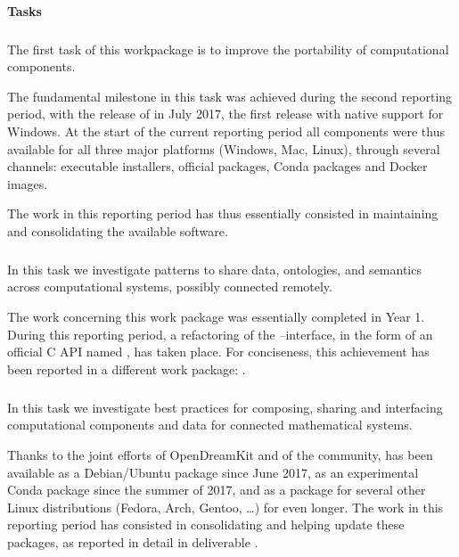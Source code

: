 \paragraph{Tasks}

  \subparagraph{}
  \label{component-architecture@portability}
  The first task of this workpackage is to improve the portability of
  computational components.

  The fundamental milestone in this task was achieved during the
  second reporting period, with the release of  in July 2017,
  the first release with native support for Windows. At the start of
  the current reporting period all \ODK components were thus available
  for all three major platforms (Windows, Mac, Linux), through several
  channels: executable installers, official packages, Conda packages
  and Docker images.

  The work in this reporting period has thus essentially consisted in
  maintaining and consolidating the available software.

  \subparagraph{}
  \label{component-architecture@interface-systems}
  In this task we investigate patterns to share data, ontologies, and
  semantics across computational systems, possibly connected remotely.
  
  The work concerning this work package was essentially completed in
  Year 1. During this reporting period, a refactoring of the
  \GAP--\Sage interface, in the form of an official C API named
  \libGAP, has taken place. For conciseness, this achievement has been
  reported in a different work package: .
  
  \subparagraph{}
  \label{component-architecture@mod-packaging}
  In this task we investigate best practices for composing, sharing
  and interfacing computational components and data for connected
  mathematical systems.

  Thanks to the joint efforts of OpenDreamKit and of the community,
  \Sage has been available as a Debian/Ubuntu package since June 2017,
  as an experimental Conda package since the summer of 2017, and as a
  package for several other Linux distributions (Fedora, Arch, Gentoo,
  \dots) for even longer. The work in this reporting period has
  consisted in consolidating and helping update these packages, as
  reported in detail in deliverable
  .

